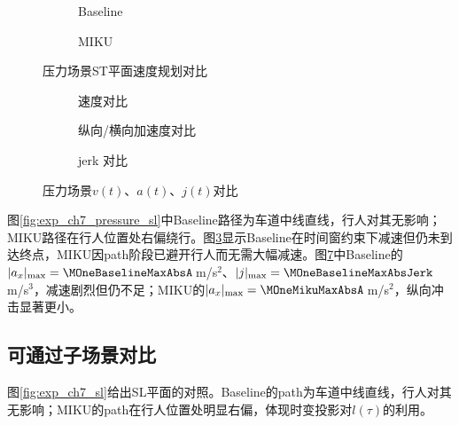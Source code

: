 \begin{figure}[H]
\centering
\begin{subfigure}[b]{0.48\textwidth}
  \centering
  
  \caption{Baseline}
  \label{fig:exp_ch7_pressure_st:a}
\end{subfigure}\hfill
\begin{subfigure}[b]{0.48\textwidth}
  \centering
  
  \caption{MIKU}
  \label{fig:exp_ch7_pressure_st:b}
\end{subfigure}
\caption{压力场景ST平面速度规划对比}
\label{fig:exp_ch7_pressure_st}
\end{figure}

\begin{figure}[H]
\centering
\begin{subfigure}[b]{\textwidth}
  \centering
  
  \caption{速度对比}
  \label{fig:exp_ch7_pressure_va:a}
\end{subfigure}

\begin{subfigure}[b]{\textwidth}
  \centering
  
  \caption{纵向/横向加速度对比}
  \label{fig:exp_ch7_pressure_va:b}
\end{subfigure}

\begin{subfigure}[b]{\textwidth}
  \centering
  
  \caption{jerk 对比}
  \label{fig:exp_ch7_pressure_va:c}
\end{subfigure}
\caption{压力场景$v(t)$、$a(t)$、$j(t)$对比}
\label{fig:exp_ch7_pressure_va}
\end{figure}

图\ref{fig:exp_ch7_pressure_sl}中Baseline路径为车道中线直线，行人对其无影响；MIKU路径在行人位置处右偏绕行。图\ref{fig:exp_ch7_pressure_st}显示Baseline在时间窗约束下减速但仍未到达终点，MIKU因path阶段已避开行人而无需大幅减速。图\ref{fig:exp_ch7_pressure_va}中Baseline的$|a_x|_{\max}=\MOneBaselineMaxAbsA$\,m/s$^2$、$|j|_{\max}=\MOneBaselineMaxAbsJerk$\,m/s$^3$，减速剧烈但仍不足；MIKU的$|a_x|_{\max}=\MOneMikuMaxAbsA$\,m/s$^2$，纵向冲击显著更小。

\subsection{可通过子场景对比}

图\ref{fig:exp_ch7_sl}给出SL平面的对照。Baseline的path为车道中线直线，行人对其无影响；MIKU的path在行人位置处明显右偏，体现时变投影对$l(\tau)$的利用。

